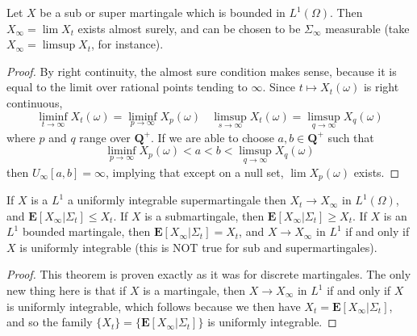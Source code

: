 \begin{theorem}
    Let $X$ be a \cadlag sub or super martingale which is bounded in $L^1(\Omega)$. Then $X_\infty = \lim X_t$ exists almost surely, and can be chosen to be $\Sigma_\infty$ measurable (take $X_\infty = \limsup X_t$, for instance).
\end{theorem}
\begin{proof}
    By right continuity, the almost sure condition makes sense, because it is equal to the limit over rational points tending to $\infty$. Since $t \mapsto X_t(\omega)$ is right continuous,
    \[ \liminf_{t \to \infty} X_t(\omega) = \liminf_{p \to \infty} X_p(\omega)\ \ \ \ \limsup_{s \to \infty} X_t(\omega) = \limsup_{q \to \infty} X_q(\omega) \]
    where $p$ and $q$ range over $\mathbf{Q}^+$. If we are able to choose $a,b \in \mathbf{Q}^+$ such that
    \[ \liminf_{p \to \infty} X_p(\omega) < a < b < \limsup_{q \to \infty} X_q(\omega) \]
    then $U_\infty[a,b] = \infty$, implying that except on a null set, $\lim X_p(\omega)$ exists.
\end{proof}

\begin{theorem}
    If $X$ is a $L^1$ a uniformly integrable supermartingale then $X_t \to X_\infty$ in $L^1(\Omega)$, and $\mathbf{E}[X_\infty|\Sigma_t] \leq X_t$. If $X$ is a submartingale, then $\mathbf{E}[X_\infty|\Sigma_t] \geq X_t$. If $X$ is an $L^1$ bounded martingale, then $\mathbf{E}[X_\infty|\Sigma_t] = X_t$, and $X \to X_\infty$ in $L^1$ if and only if $X$ is uniformly integrable (this is NOT true for sub and supermartingales).
\end{theorem}
\begin{proof}
    This theorem is proven exactly as it was for discrete martingales. The only new thing here is that if $X$ is a martingale, then $X \to X_\infty$ in $L^1$ if and only if $X$ is uniformly integrable, which follows because we then have $X_t = \mathbf{E}[X_\infty|\Sigma_t]$, and so the family $\{ X_t \} = \{ \mathbf{E}[X_\infty|\Sigma_t] \}$ is uniformly integrable.
\end{proof}

